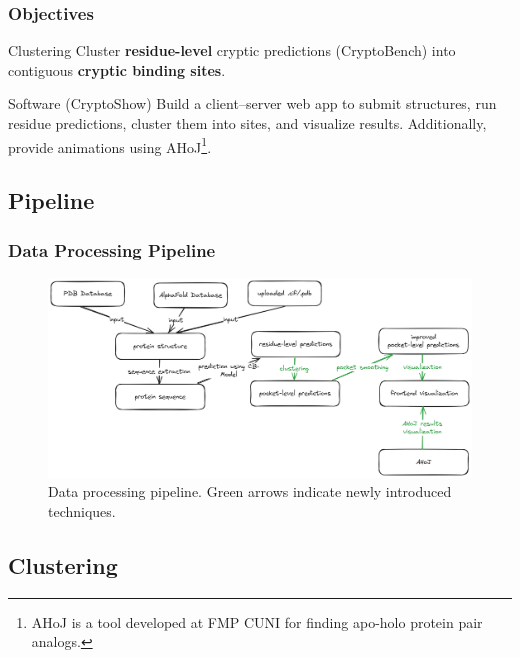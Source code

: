 \documentclass[aspectratio=169]{beamer}
\begin{document}
\begin{frame}
  \frametitle{Objectives}
  \begin{block}{Clustering}
    Cluster \textbf{residue-level} cryptic predictions (CryptoBench) into contiguous \textbf{cryptic binding sites}.
  \end{block}

  \begin{block}{Software (CryptoShow)}
    Build a client–server web app to submit structures, run residue predictions, cluster them into sites, and visualize results. Additionally, provide animations using AHoJ\footnote{AHoJ is a tool developed at FMP CUNI for finding apo-holo protein pair analogs.}.
  \end{block}
\end{frame}

\subsection{Pipeline}

\begin{frame}
  \frametitle{Data Processing Pipeline}

  \begin{figure}
    \includegraphics[width=\textwidth]{fig/pipeline.png}
    \caption{Data processing pipeline. \textcolor{ITMOdarkgreen}{Green arrows} indicate newly introduced techniques.}
  \end{figure}

\end{frame}

\subsection{Clustering}
\end{document}

